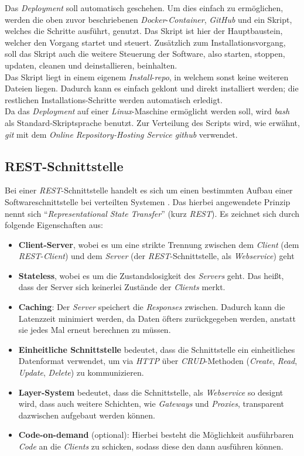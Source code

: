 	Das \textit{Deployment} soll automatisch geschehen. Um dies einfach zu ermöglichen, werden die oben zuvor beschriebenen \textit{Docker}-\textit{Container}, \textit{GitHub} und ein Skript, welches die Schritte ausführt, genutzt. Das Skript ist hier der Hauptbaustein, welcher den Vorgang startet und steuert. Zusätzlich zum Installationsvorgang, soll das Skript auch die weitere Steuerung der Software, also starten, stoppen, updaten, cleanen und deinstallieren, beinhalten.~\\
	Das Skript liegt in einem eigenem \textit{Install}-\textit{\Gls{repo}}, in welchem sonst keine weiteren Dateien liegen. Dadurch kann es einfach geklont und direkt installiert werden; die restlichen Installations-Schritte werden automatisch erledigt.~\\
	Da das \textit{Deployment} auf einer \textit{Linux}-Maschine ermöglicht werden soll, wird \textit{\Gls{bash}} als Standard-Skriptsprache benutzt. Zur Verteilung des Scripts wird, wie erwähnt, \textit{\Gls{git}} mit dem \textit{Online Repository-Hosting Service \Gls{github}} verwendet.
	\subsection{REST-Schnittstelle}
	Bei einer \textit{REST}-Schnittstelle handelt es sich um einen bestimmten Aufbau einer Softwareschnittstelle bei verteilten Systemen \cite{Patni2017}. Das hierbei angewendete Prinzip nennt sich \enquote{\textit{Representational State Transfer}} (kurz \textit{REST}). Es zeichnet sich durch folgende Eigenschaften aus:
	\begin{itemize}
		\item \textbf{Client-Server}, wobei es um eine strikte Trennung zwischen dem \textit{Client} (dem \textit{REST}-\textit{Client}) und dem \textit{Server} (der \textit{REST}-Schnittstelle, als \textit{Webservice}) geht
		\item \textbf{Stateless}, wobei es um die Zustandslosigkeit des \textit{Servers} geht. Das heißt, dass der Server sich keinerlei Zustände der \textit{Clients} merkt.
		\item \textbf{Caching}: Der \textit{Server} speichert die \textit{Responses} zwischen. Dadurch kann die Latenzzeit minimiert werden, da Daten öfters zurückgegeben werden, anstatt sie jedes Mal erneut berechnen zu müssen.
		\item \textbf{Einheitliche Schnittstelle} bedeutet, dass die Schnittstelle ein einheitliches Datenformat verwendet, um via \textit{HTTP} über \textit{CRUD}-Methoden (\textit{Create}, \textit{Read}, \textit{Update}, \textit{Delete}) zu kommunizieren.
		\item \textbf{Layer-System} bedeutet, dass die Schnittstelle, als \textit{Webservice} so designt wird, dass auch weitere Schichten, wie \textit{Gateways} und \textit{Proxies}, transparent dazwischen aufgebaut werden können.
		\item \textbf{Code-on-demand} (optional): Hierbei besteht die Möglichkeit ausführbaren \textit{Code} an die \textit{Clients} zu schicken, sodass diese den dann ausführen können.
	\end{itemize}
	\label{code:rest}
